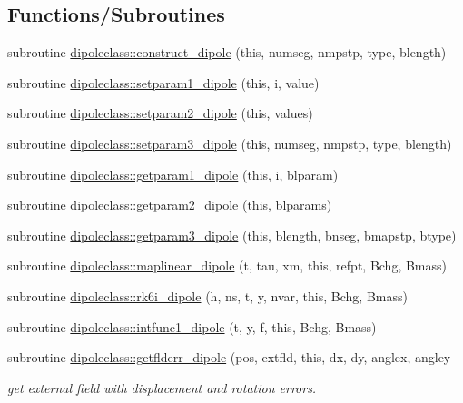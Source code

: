 \subsection*{Functions/\+Subroutines}
\begin{DoxyCompactItemize}
\item 
subroutine \mbox{\hyperlink{namespacedipoleclass_ad926e6953a9110fb9662f9d75aec0578}{dipoleclass\+::construct\+\_\+dipole}} (this, numseg, nmpstp, type, blength)
\item 
subroutine \mbox{\hyperlink{namespacedipoleclass_a88c00f58bdecf1b9c087e1fa6fe4d890}{dipoleclass\+::setparam1\+\_\+dipole}} (this, i, value)
\item 
subroutine \mbox{\hyperlink{namespacedipoleclass_af9b4f7bb26e407880166d1b7d19f8877}{dipoleclass\+::setparam2\+\_\+dipole}} (this, values)
\item 
subroutine \mbox{\hyperlink{namespacedipoleclass_a46e12e75054e010d776e23895101e223}{dipoleclass\+::setparam3\+\_\+dipole}} (this, numseg, nmpstp, type, blength)
\item 
subroutine \mbox{\hyperlink{namespacedipoleclass_af02462235721b966a71753610096e85a}{dipoleclass\+::getparam1\+\_\+dipole}} (this, i, blparam)
\item 
subroutine \mbox{\hyperlink{namespacedipoleclass_af793a317f0b5d337d6818755609641a7}{dipoleclass\+::getparam2\+\_\+dipole}} (this, blparams)
\item 
subroutine \mbox{\hyperlink{namespacedipoleclass_a6a7322bcea3d9d07affd0628002985fd}{dipoleclass\+::getparam3\+\_\+dipole}} (this, blength, bnseg, bmapstp, btype)
\item 
subroutine \mbox{\hyperlink{namespacedipoleclass_a3388afe517788e8b824b96bf49793510}{dipoleclass\+::maplinear\+\_\+dipole}} (t, tau, xm, this, refpt, Bchg, Bmass)
\item 
subroutine \mbox{\hyperlink{namespacedipoleclass_a1a92cd51d6ad864d251dd3abdc361ba8}{dipoleclass\+::rk6i\+\_\+dipole}} (h, ns, t, y, nvar, this, Bchg, Bmass)
\item 
subroutine \mbox{\hyperlink{namespacedipoleclass_ab15f3a0defc0de419f5613659abc9cad}{dipoleclass\+::intfunc1\+\_\+dipole}} (t, y, f, this, Bchg, Bmass)
\item 
subroutine \mbox{\hyperlink{namespacedipoleclass_a0a75204835a2e4dd1ea67c1ee32e62fe}{dipoleclass\+::getflderr\+\_\+dipole}} (pos, extfld, this, dx, dy, anglex, angley
\begin{DoxyCompactList}\small\item\em get external field with displacement and rotation errors. \end{DoxyCompactList}\item 

\end{DoxyCompactItemize}
